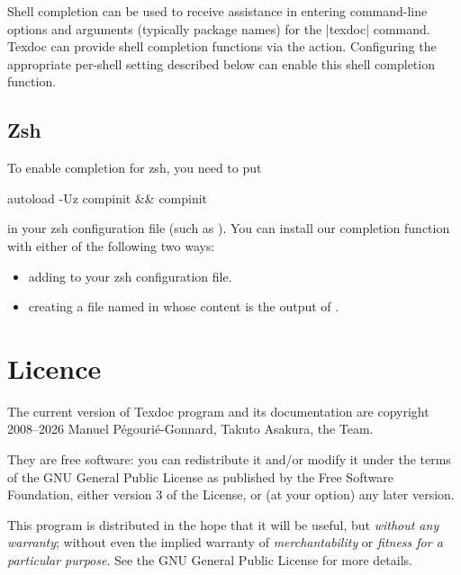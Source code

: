 \documentclass{texdoc-doc}
\begin{document}
Shell completion can be used to receive assistance in entering command-line
options and arguments (typically package names) for the |texdoc| command.
Texdoc can provide shell completion functions via the 
action. Configuring the appropriate per-shell setting described below can
enable this shell completion function.


\subsection{Zsh}

To enable completion for zsh, you need to put
%
\begin{htcode}
autoload -Uz compinit && compinit
\end{htcode}
%
in your zsh configuration file (such as ). You can install
our completion function with either of the following two ways:
%
\begin{itemize}
\item adding  to your
  zsh configuration file.

\item creating a file named  in  whose content is
  the output of .
\end{itemize}

\section{Licence}
\label{sec:licence}

The current version of Texdoc program and its documentation are copyright
2008--2026 Manuel Pégourié-Gonnard, Takuto Asakura, the {\TL} Team.

They are free software: you can redistribute it and/or modify it under the
terms of the GNU General Public License as published by the Free Software
Foundation, either version 3 of the License, or (at your option) any later
version.

This program is distributed in the hope that it will be useful, but
\emph{without any warranty}; without even the implied warranty of
\emph{merchantability} or \emph{fitness for a particular purpose}. See the
GNU General Public License for more details.
\end{document}
